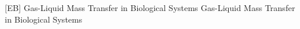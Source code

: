 \documentclass[\mainfilename]{subfiles}
\begin{document}

[EB]
{Gas-Liquid Mass Transfer in Biological Systems} %
{Gas-Liquid Mass Transfer in Biological Systems} %
\end{document}

